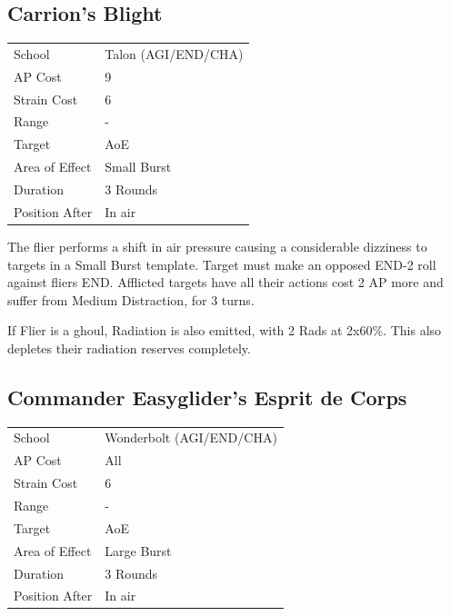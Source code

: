 \documentclass[11pt,a4paper,twocolumn]{book}
\begin{document}
\subsection*{Carrion's Blight}
{
	\begin{tabu} to 75mm{| X[l,4] | X[l,7] |}
		\hline
		School 			& Talon (AGI/END/CHA)			\\
        AP Cost	      	& 9 				\\
        Strain Cost     & 6 				\\
        Range     		& - 				\\
        Target      	& AoE 				\\
        Area of Effect  & Small Burst 	 	\\
        Duration     	& 3 Rounds	 	\\
		Position After  & In air 			\\ \hline
	\end{tabu}
		
}

\medskip

The flier performs a shift in air pressure causing a considerable dizziness to targets in a Small Burst template.
Target must make an opposed END-2 roll against fliers END. Afflicted targets have all their actions cost 2 AP more and suffer from Medium Distraction, for 3 turns.

If Flier is a ghoul, Radiation is also emitted, with 2 Rads at 2x60\%. This also depletes their radiation reserves completely.


\subsection*{Commander Easyglider's Esprit de Corps}
{
	\begin{tabu} to 75mm{| X[l,4] | X[l,7] |}
		\hline
		School 			& Wonderbolt (AGI/END/CHA) 		\\
        AP Cost	      	& All 				\\
        Strain Cost     & 6 				\\
        Range     		& - 				\\
        Target      	& AoE 				\\
        Area of Effect  & Large Burst 	 	\\
        Duration     	& 3 Rounds	 			\\
		Position After  & In air 			\\ \hline
	\end{tabu}
		
}
\end{document}
